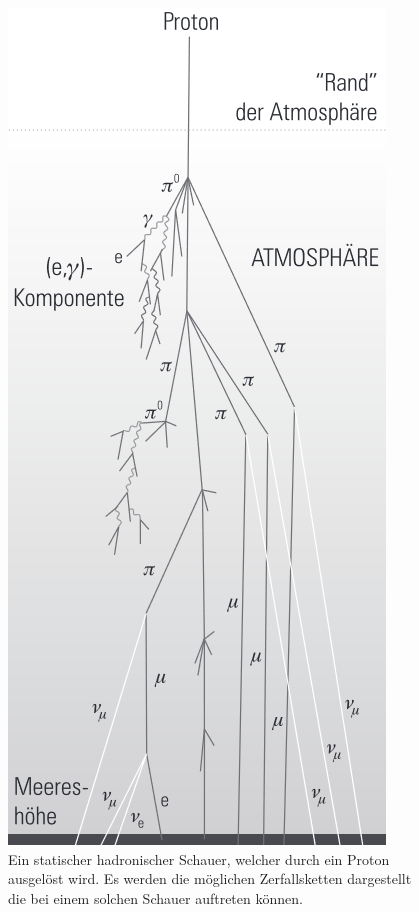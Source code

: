 \begin{figure}
\begin{minipage}{0.4\textwidth}
    \includegraphics[width=\textwidth]{data/hadronischerschauer.png}
    \caption{Ein statischer hadronischer Schauer, welcher durch ein Proton ausgelöst wird.
    Es werden die möglichen Zerfallsketten dargestellt die bei einem solchen Schauer auftreten können. \cite{astroteilchenbuch}}
    \label{fig:hadronischerschauer}
\end{minipage}
\end{figure}\FloatBarrier
